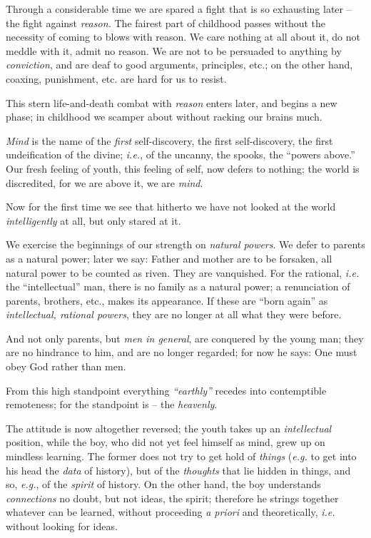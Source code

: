 Through a considerable time we are spared a fight that is so exhausting later -- the fight against \textit{reason.} The fairest part of childhood passes 
without the necessity of coming to blows with reason. We care nothing at all 
about it, do not meddle with it, admit no reason. We are not to be persuaded 
to anything by \textit{conviction}, and are deaf to good arguments, 
principles, etc.; on the other hand, coaxing, punishment, etc. are hard for us 
to resist.

This stern life-and-death combat with \textit{reason} enters later, and begins 
a new phase; in childhood we scamper about without racking our brains much.

\textit{Mind} is the name of the \textit{first} self-discovery, the first 
self-discovery, the first undeification of the divine; \textit{i.e.}, of the 
uncanny, the spooks, the ``powers above.'' Our fresh feeling of youth, this 
feeling of self, now defers to nothing; the world is discredited, for we are 
above it, we are \textit{mind}.

Now for the first time we see that hitherto we have not looked at the world 
\textit{intelligently} at all, but only stared at it.

We exercise the beginnings of our strength on \textit{natural powers}. We 
defer to parents as a natural power; later we say: Father and mother are to be 
forsaken, all natural power to be counted as riven. They are vanquished. For 
the rational, \textit{i.e.} the ``intellectual'' man, there is no family as 
a natural power; a renunciation of parents, brothers, etc., makes its 
appearance. If these are ``born again'' as \textit{intellectual, rational 
powers}, they are no longer at all what they were before.

And not only parents, but \textit{men in general}, are conquered by the young 
man; they are no hindrance to him, and are no longer regarded; for now he 
says: One must obey God rather than men.

From this high standpoint everything \textit{``earthly''} recedes into 
contemptible remoteness; for the standpoint is -- the \textit{heavenly}.

The attitude is now altogether reversed; the youth takes up an 
\textit{intellectual} position, while the boy, who did not yet feel himself as 
mind, grew up on mindless learning. The former does not try to get hold of 
\textit{things} (\textit{e.g.} to get into his head the \textit{data} of 
history), but of the \textit{thoughts} that lie hidden in things, and so, 
\textit{e.g.}, of the \textit{spirit} of history. On the other hand, the boy 
understands \textit{connections} no doubt, but not ideas, the spirit; 
therefore he strings together whatever can be learned, without proceeding 
\textit{a priori} and theoretically, \textit{i.e.} without looking for ideas.

